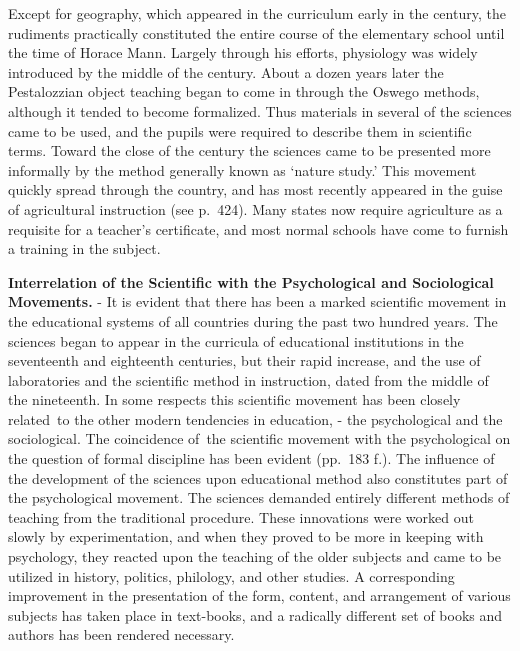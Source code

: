 \documentclass[]{book}
\begin{document}
Except for geography, which appeared in the curriculum early in the century, the rudiments practically constituted the entire course of the elementary school until the time of Horace Mann. Largely through his efforts, physiology was widely introduced by the middle of the century. About a dozen years later the Pestalozzian object teaching began to come in through the Oswego methods, although it tended to become formalized. Thus materials in several of the sciences came to be used, and the pupils were required to describe them in scientific terms. Toward the close of the century the sciences came to be presented more informally by the method generally known as `nature study.' This movement quickly spread through the country, and has most recently appeared in the guise of agricultural instruction (see p.~424). Many states now require agriculture as a requisite for a teacher's certificate, and most normal schools have come to furnish a training in the subject.

\textbf{Interrelation of the Scientific with the Psychological and Sociological Movements.} - It is evident that there has been a marked scientific movement in the educational systems of all countries during the past two hundred years. The sciences began to appear in the curricula of educational institutions in the seventeenth and eighteenth centuries, but their rapid increase, and the use of laboratories and the scientific method in instruction, dated from the middle of the nineteenth. In some respects this scientific movement has been closely related~to the other modern tendencies in education, - the psychological and the sociological. The coincidence of~the scientific movement with the psychological on the question of formal discipline has been evident (pp.~183 f.). The influence of the development of the sciences upon educational method also constitutes part of the psychological movement. The sciences demanded entirely different methods of teaching from the traditional procedure. These innovations were worked out slowly by experimentation, and when they proved to be more in keeping with psychology, they reacted upon the teaching of the older subjects and came to be utilized in history, politics, philology, and other studies. A corresponding improvement in the presentation of the form, content, and arrangement of various subjects has taken place in text-books, and a radically different set of books and authors has been rendered necessary.
\end{document}

